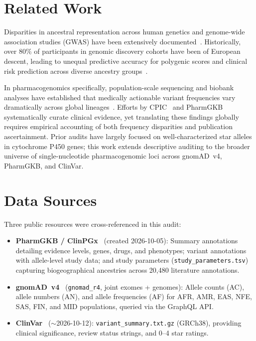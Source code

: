 \documentclass[conference]{IEEEtran}
\begin{document}
\section{Related Work}

Disparities in ancestral representation across human genetics and genome-wide association studies (GWAS) have been extensively documented~\cite{popejoy2016, sirugo2019, martin2019, wojcik2019}.
Historically, over 80\% of participants in genomic discovery cohorts have been of European descent, leading to unequal predictive accuracy for polygenic scores and clinical risk prediction across diverse ancestry groups~\cite{martin2019, gurdasani2019}.

In pharmacogenomics specifically, population-scale sequencing and biobank analyses have established that medically actionable variant frequencies vary dramatically across global lineages~\cite{mcinnes2021, zhou2017}.
Efforts by CPIC~\cite{cpic} and PharmGKB~\cite{pharmgkb} systematically curate clinical evidence, yet translating these findings globally requires empirical accounting of both frequency disparities and publication ascertainment.
Prior audits have largely focused on well-characterized star alleles in cytochrome P450 genes; this work extends descriptive auditing to the broader universe of single-nucleotide pharmacogenomic loci across gnomAD~v4, PharmGKB, and ClinVar.

\section{Data Sources}

Three public resources were cross-referenced in this audit:

\begin{itemize}
    \item \textbf{PharmGKB / ClinPGx}~\cite{pharmgkb} (created 2026-10-05): Summary annotations detailing evidence levels, genes, drugs, and phenotypes; variant annotations with allele-level study data; and study parameters (\texttt{study\_parameters.tsv}) capturing biogeographical ancestries across 20,480 literature annotations.
    \item \textbf{gnomAD~v4}~\cite{gnomad} (\texttt{gnomad\_r4}, joint exomes + genomes): Allele counts (AC), allele numbers (AN), and allele frequencies (AF) for AFR, AMR, EAS, NFE, SAS, FIN, and MID populations, queried via the GraphQL API.
    \item \textbf{ClinVar}~\cite{clinvar} ($\sim$2026-10-12): \texttt{variant\_summary.txt.gz} (GRCh38), providing clinical significance, review status strings, and 0--4 star ratings.
\end{itemize}
\end{document}
